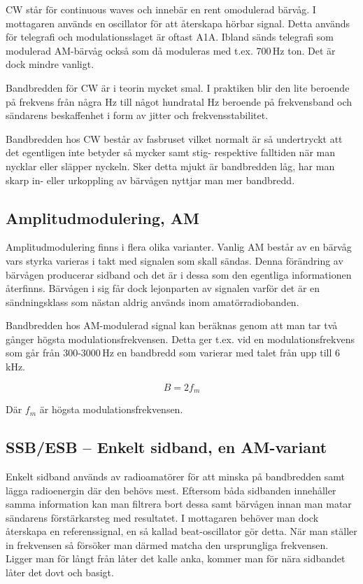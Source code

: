 CW står för continuous waves och innebär en rent omodulerad bärvåg. I
mottagaren används en oscillator för att återskapa hörbar signal. Detta
används för telegrafi och modulationsslaget är oftast A1A. Ibland sänds
telegrafi som modulerad AM-bärvåg också som då moduleras med t.ex. 700\,Hz
ton. Det är dock mindre vanligt.

Bandbredden för CW är i teorin mycket smal. I praktiken blir den lite beroende
på frekvens från några Hz till något hundratal Hz beroende på frekvensband och
sändarens beskaffenhet i form av jitter och frekvensstabilitet.

Bandbredden hos CW består av fasbruset vilket normalt är så undertryckt att det
egentligen inte betyder så mycker samt stig- respektive falltiden när man
nycklar eller släpper nyckeln. Sker detta mjukt är bandbredden låg, har man
skarp in- eller urkoppling av bärvågen nyttjar man mer bandbredd.

\subsection{Amplitudmodulering, AM}

Amplitudmodulering finns i flera olika varianter. Vanlig AM består av en
bärvåg vars styrka varieras i takt med signalen som skall sändas. Denna
förändring av bärvågen producerar sidband och det är i dessa som den egentliga
informationen återfinns. Bärvågen i sig får dock lejonparten av signalen
varför det är en sändningsklass som nästan aldrig används inom
amatörradiobanden.

Bandbredden hos AM-modulerad signal kan beräknas genom att man tar två gånger
högsta modulationsfrekvensen. Detta ger t.ex. vid en modulationsfrekvens som
går från 300-3000\,Hz en bandbredd som varierar med talet från upp till
6\,kHz.

\begin{equation}
	B=2f_m
\end{equation}

Där $f_m$ är högsta modulationsfrekvensen.

\subsection{SSB/ESB -- Enkelt sidband, en AM-variant}

Enkelt sidband används av radioamatörer för att minska på bandbredden samt
lägga radioenergin där den behövs mest. Eftersom båda sidbanden innehåller
samma information kan man filtrera bort dessa samt bärvågen innan man matar
sändarens förstärkarsteg med resultatet. I mottagaren behöver man dock
återskapa en referenssignal, en så kallad beat-oscillator gör detta. När man
ställer in frekvensen så försöker man därmed matcha den ursprungliga
frekvensen. Ligger man för långt från låter det kalle anka, kommer man för
nära sidbandet låter det dovt och basigt.

